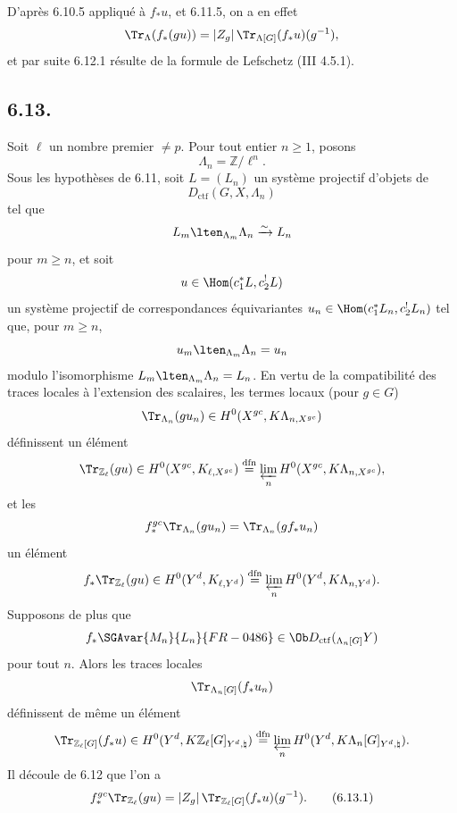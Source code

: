 D'après 6.10.5 appliqué à $f_*u$, et 6.11.5, on a en effet
\[
\Tr_{\Lambda}(f_*(gu))=|Z_g|\,\Tr_{\Lambda[G]}(f_*u)(g^{-1}),
\]
et par suite 6.12.1 résulte de la formule de Lefschetz (III 4.5.1).

\subsection*{6.13.}
Soit $\ell$ un nombre premier $\ne p$. Pour tout entier $n\ge1$, posons
\[
\Lambda_n=\mathbb{Z}/\ell^n.
\]
Sous les hypothèses de 6.11, soit $L=(L_n)$ un système projectif 
d'objets de
\[
D_{\mathrm{ctf}}(G,X,\Lambda_n)
\]
tel que
\[
L_m\lten_{\Lambda_m}\Lambda_n\xrightarrow{\sim}L_n
\]
pour $m\ge n$, et soit
\[
u\in\Hom(c_1^*L,c_2^!L)
\]
un système projectif de correspondances équivariantes $u_n\in\Hom(c_1^*L_n,c_2^!L_n)$ tel que, pour $m\ge n$,
\[
u_m\lten_{\Lambda_m}\Lambda_n=u_n
\]
modulo l'isomorphisme $L_m\lten_{\Lambda_m}\Lambda_n=L_n$. En vertu de la compatibilité des traces locales à l'extension des scalaires, les termes locaux (pour $g\in G$)
\[
\Tr_{\Lambda_n}(gu_n)\in H^0(X^{gc},K\Lambda_{n,X^{gc}})
\]
définissent un élément
\[
\Tr_{\mathbb{Z}_{\ell}}(gu)\in
H^0(X^{gc},K_{\ell,X^{gc}})
\stackrel{\mathrm{dfn}}{=}
\varprojlim_n H^0(X^{gc},K\Lambda_{n,X^{gc}}),
\]
et les
\[
f_*^{gc}\Tr_{\Lambda_n}(gu_n)=\Tr_{\Lambda_n}(gf_*u_n)
\]
un élément
\[
f_*\Tr_{\mathbb{Z}_{\ell}}(gu)\in
H^0(Y^d,K_{\ell,Y^d})
\stackrel{\mathrm{dfn}}{=}
\varprojlim_n H^0(Y^d,K\Lambda_{n,Y^d}).
\]
Supposons de plus que
\[
f_*\SGAvar{M_n}{L_n}{FR-0486}\in\Ob D_{\mathrm{ctf}}({}_{\Lambda_n[G]}Y)
\]
pour tout $n$. Alors les traces locales
\[
\Tr_{\Lambda_n[G]}(f_*u_n)
\]
définissent de même un élément
\[
\Tr_{\mathbb{Z}_{\ell}[G]}(f_*u)\in
H^0(Y^d,K\mathbb{Z}_{\ell}[G]_{Y^d,\natural})
\stackrel{\mathrm{dfn}}{=}
\varprojlim_n H^0(Y^d,K\Lambda_n[G]_{Y^d,\natural}).
\]
Il découle de 6.12 que l'on a
\begin{equation}
f_*^{gc}\Tr_{\mathbb{Z}_{\ell}}(gu)
=
|Z_g|\,\Tr_{\mathbb{Z}_{\ell}[G]}(f_*u)(g^{-1}).
\tag{6.13.1}
\end{equation}

